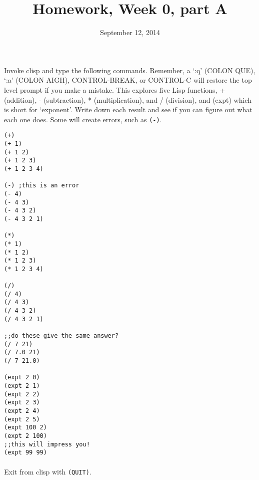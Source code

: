 \documentclass{article}
\title{Homework, Week 0, part A}
\date{September 12, 2014}
\begin{document}
\maketitle{}
\lstset{language=Lisp}

\paragraph{}Invoke clisp and type the following commands. Remember, a `:q' (COLON QUE), `:a' (COLON AIGH), CONTROL-BREAK, or CONTROL-C will restore the top level prompt if you make a mistake. This explores five Lisp functions, + (addition), - (subtraction), * (multiplication), and / (division), and (expt) which is short for `exponent'. Write down each result and see if you can figure out what each one does. Some will create errors, such as \texttt{(-)}.\\

\begin{multicols}{2}
\begin{lstlisting}
(+)
(+ 1)
(+ 1 2)
(+ 1 2 3)
(+ 1 2 3 4)

(-) ;this is an error
(- 4)
(- 4 3)
(- 4 3 2)
(- 4 3 2 1)

(*)
(* 1)
(* 1 2)
(* 1 2 3)
(* 1 2 3 4)

(/)
(/ 4)
(/ 4 3)
(/ 4 3 2)
(/ 4 3 2 1)

;;do these give the same answer?
(/ 7 21)
(/ 7.0 21)
(/ 7 21.0)

(expt 2 0)
(expt 2 1)
(expt 2 2)
(expt 2 3)
(expt 2 4)
(expt 2 5)
(expt 100 2)
(expt 2 100)
;;this will impress you!
(expt 99 99)
\end{lstlisting}
\end{multicols}

\paragraph{}Exit from clisp with \texttt{(QUIT)}.
\end{document}
